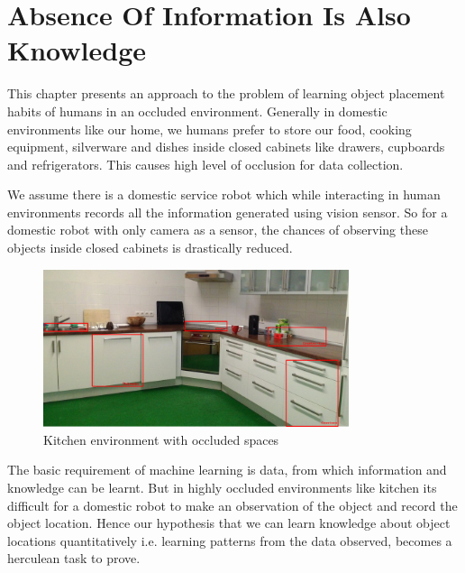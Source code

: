 \chapter{Absence Of Information Is Also Knowledge}

This chapter presents an approach to the problem of learning object placement habits of humans in an occluded environment. Generally in domestic environments like our home, we humans prefer to store our food, cooking equipment, silverware and dishes inside closed cabinets like drawers, cupboards and refrigerators. This causes high level of occlusion for data collection.

We assume there is a domestic service robot which while interacting in human environments records all the information generated using vision sensor.
So for a domestic robot with only camera as a sensor, the chances of observing  these objects inside closed cabinets is drastically reduced.

\begin{figure}[htp]
\centering
\includegraphics[width=0.8\textwidth]{images/kitchen_crop_ano.png}
\caption{Kitchen environment with occluded spaces}
\label{fig:kitchen occluded}
\end{figure}

The basic requirement of machine learning is data, from which information and knowledge can be learnt. But in highly occluded environments like kitchen its difficult for a domestic robot to make an observation of the object and record the object location.  Hence our hypothesis that we can learn knowledge about object locations quantitatively i.e. learning patterns from the data observed, becomes a herculean task to prove.

